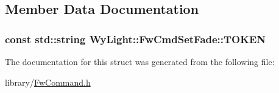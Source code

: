 \subsection{Member Data Documentation}
\hypertarget{struct_wy_light_1_1_fw_cmd_set_fade_a43d478936fa849d3e3ac95775ce287b6}{
\subsubsection[{T\-O\-K\-E\-N}]{\setlength{\rightskip}{0pt plus 5cm}const std\-::string Wy\-Light\-::\-Fw\-Cmd\-Set\-Fade\-::\-T\-O\-K\-E\-N\hspace{0.3cm}{\ttfamily [static]}}}\label{struct_wy_light_1_1_fw_cmd_set_fade_a43d478936fa849d3e3ac95775ce287b6}


The documentation for this struct was generated from the following file\-:\begin{DoxyCompactItemize}
\item 
library/\hyperlink{_fw_command_8h}{Fw\-Command.\-h}\end{DoxyCompactItemize}
